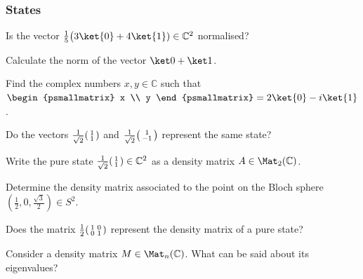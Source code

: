 \documentclass[a4paper,oneside, 12pt]{amsart}
\begin{document}
\subsubsection*{States}
\begin{thmlist}
  \item  Is the vector \( \tfrac{1}{5} \big(3\ket{0} + 4\ket{1}) \in \mathbb{C}^{2}\) normalised?
  \item Calculate the norm of the vector \(\ket 0 + \ket 1\).
  \item Find the complex numbers \(x, y\in \mathbb{C}\) such that \(
  \begin{psmallmatrix}
    x \\ y
  \end{psmallmatrix} = 2\ket{0} - i\ket{1}\).
  \item Do the vectors \(
  \tfrac{1}{\sqrt{2}}
  \begin{psmallmatrix}
    1 \\1
  \end{psmallmatrix}
\) and \( \tfrac{1}{\sqrt{2}}
  \begin{psmallmatrix}
    1 \\-1
  \end{psmallmatrix}\)
  represent the same state?
  \item Write the pure state \(\tfrac{1}{\sqrt{2}}
  \begin{psmallmatrix}
    1 \\1
  \end{psmallmatrix} \in \mathbb{C}^{2}\) as a density matrix \(A \in \Mat_{2}( \mathbb{C})\).
  \item Determine the density matrix associated to the point on the Bloch sphere \((\tfrac{1}{2}, 0, \tfrac{\sqrt{3}}{2})\in S^{2}\).
  \item Does the matrix \(\tfrac{1}{2} \begin{psmallmatrix} 1 & 0 \\ 0 & 1 \end{psmallmatrix}\) represent the density matrix of a pure state?
  \item Consider a density matrix \(M \in \Mat_{n}( \mathbb{C})\). What can be said about its eigenvalues?
\end{thmlist}
\end{document}
